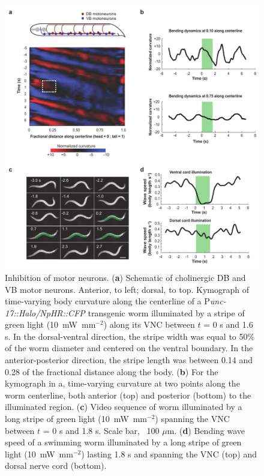 \begin{figure} 
\includegraphics[width=\textwidth]{figures/colbert3}
\caption[Inhibition of motor neurons. ]{ Inhibition of motor neurons.  (\textbf{a}) Schematic of cholinergic DB and VB motor neurons. Anterior, to left; dorsal, to top. Kymograph of time-varying body curvature along the centerline of a P\textit{unc-17::Halo/NpHR::CFP} transgenic worm illuminated by a stripe of green light (10~mW~mm$^{-2}$) along its VNC between $t$ = 0 s and 1.6 s. In the dorsal-ventral direction, the stripe width was equal to 50\% of the worm diameter and centered on the ventral boundary. In the anterior-posterior direction, the stripe length was between 0.14 and 0.28 of the fractional distance along the body. (\textbf{b}) For the kymograph in a, time-varying curvature at two points along the worm centerline, both anterior (top) and posterior (bottom) to the illuminated region. (\textbf{c}) Video sequence of worm illuminated by a long stripe of green light (10~mW~mm$^{-2}$) spanning the VNC between $t$ = 0 s and 1.8 s. Scale bar, ~100 $\mu$m. (\textbf{d}) Bending wave speed of a swimming worm illuminated by a long stripe of green light (10~mW~mm$^{-2}$) lasting 1.8 s and spanning the VNC (top) and dorsal nerve cord (bottom).\label{fig:colbert3}}
\end{figure}

